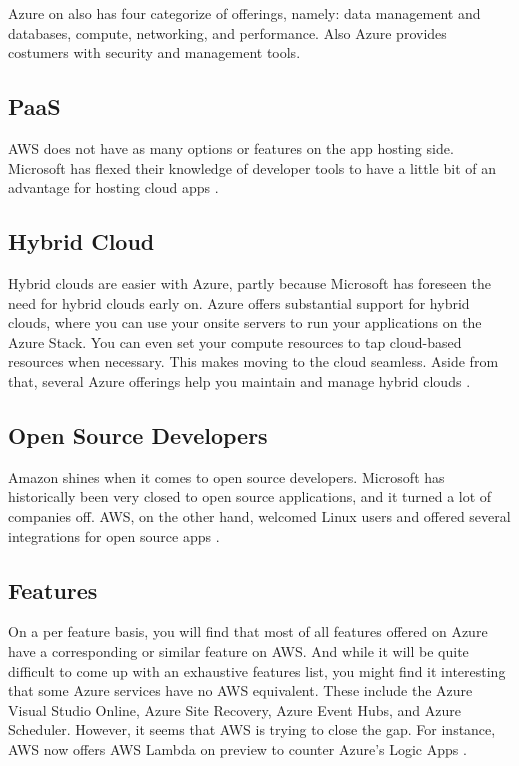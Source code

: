Azure on also has four categorize of offerings, namely: data management and databases, compute, networking, and performance. Also Azure provides costumers with security and management tools. 

\subsection{PaaS}
AWS does not have as many options or features on the app hosting side. Microsoft has flexed their knowledge of developer tools to have a little bit of an advantage for hosting cloud apps \cite{stackify}.

\subsection{Hybrid Cloud}
Hybrid clouds are easier with Azure, partly because Microsoft has foreseen the need for hybrid clouds early on.  Azure offers substantial support for hybrid clouds, where you can use your onsite servers to run your applications on the Azure Stack.  You can even set your compute resources to tap cloud-based resources when necessary. This makes moving to the cloud seamless.  Aside from that, several Azure offerings help you maintain and manage hybrid clouds \cite{stackify}.

\subsection{Open Source Developers}
Amazon shines when it comes to open source developers.  Microsoft has historically been very closed to open source applications, and it turned a lot of companies off.  AWS, on the other hand, welcomed Linux users and offered several integrations for open source apps \cite{stackify}.

\subsection{Features}
On a per feature basis, you will find that most of all features offered on Azure have a corresponding or similar feature on AWS.  And while it will be quite difficult to come up with an exhaustive features list, you might find it interesting that some Azure services have no AWS equivalent. These include the Azure Visual Studio Online, Azure Site Recovery, Azure Event Hubs, and Azure Scheduler.  However, it seems that AWS is trying to close the gap.  For instance, AWS now offers AWS Lambda on preview to counter Azure’s Logic Apps \cite{stackify}.


